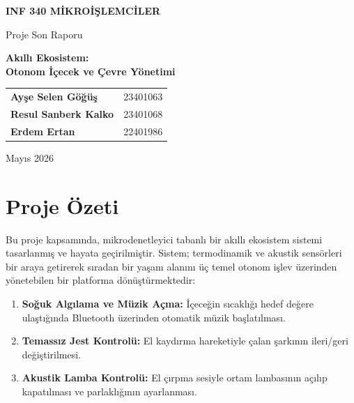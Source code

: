 \documentclass[12pt, a4paper]{article}
\begin{document}
\begin{titlepage}
  \centering
  \vspace*{1.5cm}
  {\Large \textbf{INF 340 MİKROİŞLEMCİLER}\par}
  \vspace{0.5cm}
  {\large Proje Son Raporu\par}
  \vspace{1.5cm}
  {\LARGE \textbf{Akıllı Ekosistem:\\ Otonom İçecek ve Çevre Yönetimi}\par}
  \vspace{2cm}
  \begin{tabular}{ll}
    \textbf{Ayşe Selen Göğüş}  & 23401063 \\[4pt]
    \textbf{Resul Sanberk Kalko} & 23401068 \\[4pt]
    \textbf{Erdem Ertan}         & 22401986 \\
  \end{tabular}
  \vfill
  {\large Mayıs 2026\par}
\end{titlepage}

\tableofcontents
\newpage

\section{Proje Özeti}

Bu proje kapsamında, mikrodenetleyici tabanlı bir akıllı ekosistem sistemi
tasarlanmış ve hayata geçirilmiştir. Sistem; termodinamik ve akustik sensörleri bir araya
getirerek sıradan bir yaşam alanını üç temel otonom işlev üzerinden yönetebilen bir
platforma dönüştürmektedir:

\begin{enumerate}[leftmargin=*, label=\arabic*.]
  \item \textbf{Soğuk Algılama ve Müzik Açma:} İçeceğin sıcaklığı hedef değere
        ulaştığında Bluetooth üzerinden otomatik müzik başlatılması.
  \item \textbf{Temassız Jest Kontrolü:} El kaydırma hareketiyle çalan şarkının
        ileri/geri değiştirilmesi.
  \item \textbf{Akustik Lamba Kontrolü:} El çırpma sesiyle ortam lambasının açılıp
        kapatılması ve parlaklığının ayarlanması.
\end{enumerate}
\end{document}
